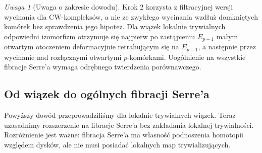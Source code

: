 \documentclass[11pt,a4paper,oneside]{report}
\theoremstyle{plain}
\theoremstyle{definition}
\theoremstyle{remark}
\newtheorem{uwaga}[twierdzenie]{Uwaga}
\begin{document}
\begin{uwaga}[Uwaga o zakresie dowodu]
Krok 2 korzysta z filtracyjnej wersji wycinania dla
CW-kompleksów, a nie ze zwykłego wycinania wzdłuż
domkniętych komórek bez sprawdzenia jego hipotez.
Dla wiązek lokalnie trywialnych odpowiedni izomorfizm
otrzymuje się najpierw po zastąpieniu $E_{p-1}$ małym
otwartym otoczeniem deformacyjnie retrahującym się
na $E_{p-1}$, a następnie przez wycinanie nad rozłącznymi
otwartymi $p$-komórkami. Uogólnienie na wszystkie fibracje
Serre'a wymaga odrębnego twierdzenia porównawczego.
\end{uwaga}

\subsection*{Od wiązek do ogólnych fibracji Serre'a}
Powyższy dowód przeprowadziliśmy dla lokalnie trywialnych wiązek.
Teraz uzasadnimy rozszerzenie na fibracje Serre'a bez zakładania
lokalnej trywialności. Rozróżnienie jest ważne: fibracja Serre'a
ma własność podnoszenia homotopii względem dysków, ale nie
musi posiadać lokalnych map trywializujących.
\end{document}
